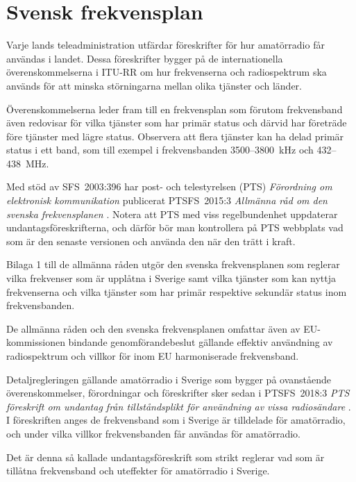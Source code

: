 \chapter{Svensk frekvensplan}
\label{svensk frekvensplan}

Varje lands teleadministration utfärdar föreskrifter för hur amatörradio får
användas i landet.
Dessa föreskrifter bygger på de internationella överenskommelserna i ITU-RR
\cite[ARTICLE 5]{ITU-RR} om hur frekvenserna och radiospektrum ska används för
att minska störningarna mellan olika tjänster och länder.

Överenskommelserna leder fram till en frekvensplan som förutom frekvensband även
redovisar för vilka tjänster som har primär status och därvid har företräde före
tjänster med lägre status.
Observera att flera tjänster kan ha delad primär status i ett band, som till
exempel i frekvensbanden 3500--3800~kHz och 432--438~MHz.

Med stöd av SFS~2003:396 har post- och telestyrelsen (PTS) 
\emph{Förordning om elektronisk kommunikation} \cite{SFS2003:396}
publicerat PTSFS~2015:3 \emph{Allmänna råd om den svenska frekvensplanen}
\cite{PTSFS2015:3}.
Notera att PTS med viss regelbundenhet uppdaterar undantagsföreskrifterna,
och därför bör man kontrollera på PTS webbplats vad som är den senaste versionen
och använda den när den trätt i kraft.

Bilaga 1 till de allmänna råden utgör den svenska frekvensplanen som reglerar
vilka frekvenser som är upplåtna i Sverige samt vilka tjänster som kan nyttja
frekvenserna och vilka tjänster som har primär respektive sekundär status inom
frekvensbanden.

\newpage

De allmänna råden och den svenska frekvensplanen omfattar även av
EU-kommissionen bindande genomförandebeslut gällande effektiv användning av
radiospektrum och villkor för inom EU harmoniserade frekvensband.

Detaljregleringen gällande amatörradio i Sverige som bygger på ovanstående
överenskommelser, förordningar och föreskrifter sker sedan i PTSFS~2018:3
\emph{PTS föreskrift om undantag från tillståndsplikt för användning av vissa
  radiosändare} \cite{PTSFS2018:3}.
I föreskriften anges de frekvensband som i Sverige är tilldelade för
amatörradio, och under vilka villkor frekvensbanden får användas för
amatörradio.

Det är denna så kallade undantagsföreskrift som strikt reglerar vad som är
tillåtna frekvensband och uteffekter för amatörradio i Sverige.

